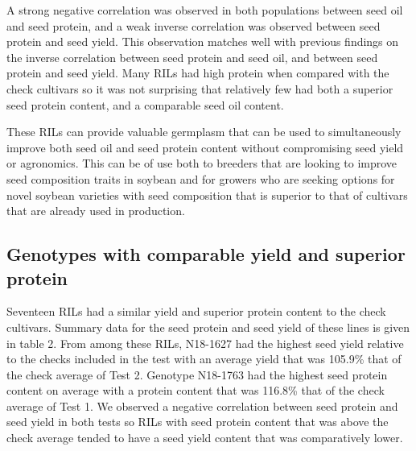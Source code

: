 \documentclass[Agronomy,article,submit,moreauthors,pdftex]{mdpi}
\begin{document}
A strong negative correlation was observed in both populations between
seed oil and seed protein, and a weak inverse correlation was observed
between seed protein and seed yield. This observation matches well with
previous findings on the inverse correlation between seed protein and
seed oil, and between seed protein and seed yield. Many RILs had high
protein when compared with the check cultivars so it was not surprising
that relatively few had both a superior seed protein content, and a
comparable seed oil content.

These RILs can provide valuable germplasm that can be used to
simultaneously improve both seed oil and seed protein content without
compromising seed yield or agronomics. This can be of use both to
breeders that are looking to improve seed composition traits in soybean
and for growers who are seeking options for novel soybean varieties with
seed composition that is superior to that of cultivars that are already
used in production.

\hypertarget{genotypes-with-comparable-yield-and-superior-protein}{%
\subsection{Genotypes with comparable yield and superior
protein}\label{genotypes-with-comparable-yield-and-superior-protein}}

Seventeen RILs had a similar yield and superior protein content to the
check cultivars. Summary data for the seed protein and seed yield of
these lines is given in table 2. From among these RILs, N18-1627 had the
highest seed yield relative to the checks included in the test with an
average yield that was 105.9\% that of the check average of Test 2.
Genotype N18-1763 had the highest seed protein content on average with a
protein content that was 116.8\% that of the check average of Test 1. We
observed a negative correlation between seed protein and seed yield in
both tests so RILs with seed protein content that was above the check
average tended to have a seed yield content that was comparatively
lower.
\end{document}
